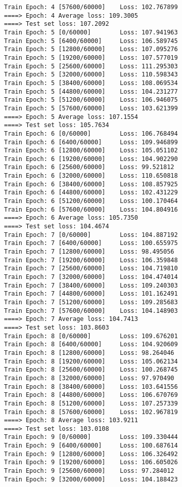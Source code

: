 \documentclass[11pt]{article}
\begin{document}
\begin{Verbatim}[commandchars=\\\{\}]
Train Epoch: 4 [57600/60000]    Loss: 102.767899
====> Epoch: 4 Average loss: 109.3005
====> Test set loss: 107.2092
Train Epoch: 5 [0/60000]        Loss: 107.941963
Train Epoch: 5 [6400/60000]     Loss: 106.589745
Train Epoch: 5 [12800/60000]    Loss: 107.095276
Train Epoch: 5 [19200/60000]    Loss: 107.577019
Train Epoch: 5 [25600/60000]    Loss: 111.295303
Train Epoch: 5 [32000/60000]    Loss: 110.598343
Train Epoch: 5 [38400/60000]    Loss: 108.069534
Train Epoch: 5 [44800/60000]    Loss: 104.231277
Train Epoch: 5 [51200/60000]    Loss: 106.946075
Train Epoch: 5 [57600/60000]    Loss: 103.621399
====> Epoch: 5 Average loss: 107.1554
====> Test set loss: 105.7634
Train Epoch: 6 [0/60000]        Loss: 106.768494
Train Epoch: 6 [6400/60000]     Loss: 109.946899
Train Epoch: 6 [12800/60000]    Loss: 105.051102
Train Epoch: 6 [19200/60000]    Loss: 104.902290
Train Epoch: 6 [25600/60000]    Loss: 99.521812
Train Epoch: 6 [32000/60000]    Loss: 110.650818
Train Epoch: 6 [38400/60000]    Loss: 108.857925
Train Epoch: 6 [44800/60000]    Loss: 102.431229
Train Epoch: 6 [51200/60000]    Loss: 100.170464
Train Epoch: 6 [57600/60000]    Loss: 104.804916
====> Epoch: 6 Average loss: 105.7350
====> Test set loss: 104.4674
Train Epoch: 7 [0/60000]        Loss: 104.887192
Train Epoch: 7 [6400/60000]     Loss: 100.655975
Train Epoch: 7 [12800/60000]    Loss: 98.495056
Train Epoch: 7 [19200/60000]    Loss: 106.359848
Train Epoch: 7 [25600/60000]    Loss: 104.719810
Train Epoch: 7 [32000/60000]    Loss: 104.474014
Train Epoch: 7 [38400/60000]    Loss: 109.240303
Train Epoch: 7 [44800/60000]    Loss: 101.162491
Train Epoch: 7 [51200/60000]    Loss: 109.285683
Train Epoch: 7 [57600/60000]    Loss: 104.148903
====> Epoch: 7 Average loss: 104.7413
====> Test set loss: 103.8603
Train Epoch: 8 [0/60000]        Loss: 109.676201
Train Epoch: 8 [6400/60000]     Loss: 104.920609
Train Epoch: 8 [12800/60000]    Loss: 98.264046
Train Epoch: 8 [19200/60000]    Loss: 105.062134
Train Epoch: 8 [25600/60000]    Loss: 100.268745
Train Epoch: 8 [32000/60000]    Loss: 97.970490
Train Epoch: 8 [38400/60000]    Loss: 103.641556
Train Epoch: 8 [44800/60000]    Loss: 106.670769
Train Epoch: 8 [51200/60000]    Loss: 107.257339
Train Epoch: 8 [57600/60000]    Loss: 102.967819
====> Epoch: 8 Average loss: 103.9211
====> Test set loss: 103.0108
Train Epoch: 9 [0/60000]        Loss: 109.330444
Train Epoch: 9 [6400/60000]     Loss: 100.687614
Train Epoch: 9 [12800/60000]    Loss: 106.326492
Train Epoch: 9 [19200/60000]    Loss: 106.605026
Train Epoch: 9 [25600/60000]    Loss: 97.284012
Train Epoch: 9 [32000/60000]    Loss: 104.188423

\end{Verbatim}
\end{document}
